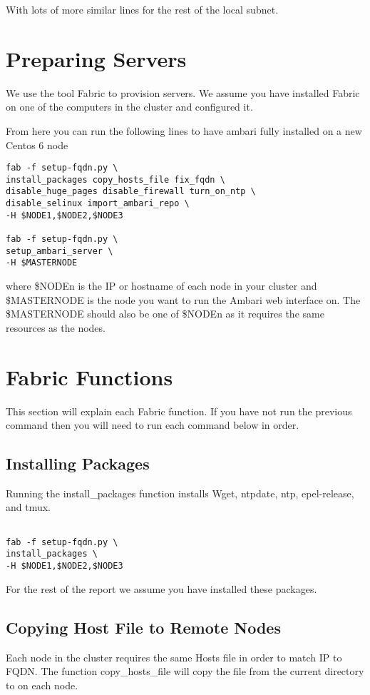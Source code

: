 \documentclass[9pt,twocolumn,twoside]{idsi}
\begin{document}
With lots of more similar lines for the rest of the local subnet.

\section{Preparing Servers}

We use the tool Fabric to provision servers. We assume you have installed Fabric on one of the computers in the cluster and configured it.

From here you can run the following lines to have ambari fully installed on a new Centos 6 node

\begin{verbatim}
fab -f setup-fqdn.py \
install_packages copy_hosts_file fix_fqdn \
disable_huge_pages disable_firewall turn_on_ntp \
disable_selinux import_ambari_repo \
-H $NODE1,$NODE2,$NODE3

fab -f setup-fqdn.py \
setup_ambari_server \
-H $MASTERNODE

\end{verbatim}

where \$NODEn is the IP or hostname of each node in your cluster and \$MASTERNODE is the node you want to run the Ambari web interface on. The \$MASTERNODE should also be one of \$NODEn as it requires the same resources as the nodes.




\section{Fabric Functions}
This section will explain each Fabric function. If you have not run the previous command then you will need to run each command below in order.

\subsection{Installing Packages}
Running the install\_packages function installs Wget, ntpdate, ntp, epel-release, and tmux.

\begin{verbatim}

fab -f setup-fqdn.py \
install_packages \
-H $NODE1,$NODE2,$NODE3

\end{verbatim}

For the rest of the report we assume you have installed these packages.

\subsection{Copying Host File to Remote Nodes}
Each node in the cluster requires the same Hosts file in order to match IP to FQDN.
The function copy\_hosts\_file will copy the file  from the current directory to  on each node.
\end{document}
